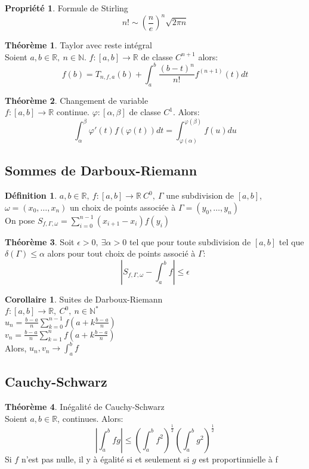 \documentclass[fleqn]{article}
\theoremstyle{definition} \newtheorem*{defi}{D\'efinition}
\theoremstyle{definition} \newtheorem*{theo}{Th\'eor\`eme}
\theoremstyle{definition} \newtheorem*{coro}{Corollaire}
\theoremstyle{remark} \newtheorem*{rqs}{Remarques}
\theoremstyle{definition} \newtheorem*{prop}{Propri\'et\'e}
\begin{document}
\begin{prop} Formule de Stirling
	\[n! \sim (\frac{n}{e})^n \sqrt{2\pi n}\]
\end{prop}

\begin{theo} Taylor avec reste int\'egral \\
	Soient $a,b \in \mathbb{R},\ n \in \mathbb{N}$. $f:[a,b] \rightarrow \mathbb{R}$ de classe $C^{n+1}$ alors:
	\[f(b) = T_{n,f,a}(b) + \int_a^b \frac{(b-t)^n}{n!} f^{(n+1)} (t)dt\]
\end{theo}

\begin{theo} Changement de variable \\
	$f:[a,b] \rightarrow \mathbb{R}$ continue. $\varphi:[\alpha, \beta]$ de classe $C^1$. Alors:
	\[\int_\alpha^\beta \varphi '(t) f(\varphi(t)) dt = \int_{\varphi(\alpha)}^{\varphi(\beta)} f(u)du\]
\end{theo}

\subsection{Sommes de Darboux-Riemann}
\begin{defi}
	$a,b \in \mathbb{R},\ f:[a,b] \rightarrow \mathbb{R}\ C^0,\ \Gamma$ une subdivision de $[a,b]$, $\omega = (x_0, \hdots, x_n)$ un choix de
	points associ\'ee \`a $\Gamma = (y_0, \hdots, y_n)$ \\
	On pose $S_{f,\Gamma, \omega} = \sum_{i=0}^{n-1} (x_{i+1} - x_i) f(y_i)$
\end{defi}
\begin{theo}
	Soit $\epsilon > 0,\ \exists \alpha > 0$ tel que pour toute subdivision de $[a,b]$ tel que $\delta(\Gamma) \leq \alpha$ alors
	pour tout choix de points associ\'e \`a $\Gamma$:
	\[|S_{f,\Gamma, \omega} - \int_a^b f| \leq \epsilon\]
\end{theo}

\begin{coro} Suites de Darboux-Riemann \\
	$f:[a,b] \rightarrow \mathbb{R},\ C^0,\ n \in \mathbb{N}^*$ \\
	$u_n = \frac{b-a}{n} \sum_{k= 0}^{n-1} f(a + k\frac{b-a}{n})$ \\
	$v_n = \frac{b-a}{n} \sum_{k= 1}^{n} f(a + k\frac{b-a}{n})$ \\
	Alors, $u_n, v_n \rightarrow \int_a^b f$
\end{coro}

\subsection{Cauchy-Schwarz}
\begin{theo} In\'egalit\'e de Cauchy-Schwarz \\
	Soient $a,b \in \mathbb{R}$, continues. Alors:
	\[\left|\int_a^b fg\right| \leq \left(\int_a^b f^2\right)^\frac{1}{2} \left(\int_a^b g^2\right)^\frac{1}{2}\]
	Si $f$ n'est pas nulle, il y \`a \'egalit\'e si et seulement si $g$ est proportinnielle \`a f
\end{theo}
\end{document}
